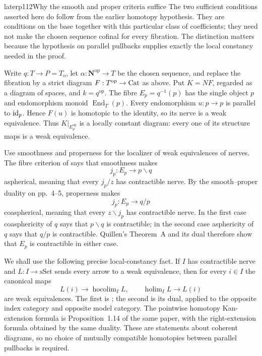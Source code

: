 \begin{dcomment}{later}{p112}{Why the smooth and proper criteria suffice}
The two sufficient conditions asserted here do follow from the earlier homotopy hypothesis. They are conditions on the base together with this particular class of coefficients; they need not make the chosen sequence cofinal for every fibration. The distinction matters because the hypothesis on parallel pullbacks supplies exactly the local constancy needed in the proof.

Write $q:T\to P=T_{\mathrm o}$, let $\alpha:\mathbf N^{\mathrm{op}}\to T$ be the chosen sequence, and replace the fibration by a strict diagram $F:T^{\mathrm{op}}\to\mathrm{Cat}$ as above. Put $K=NF$, regarded as a diagram of spaces, and $k=q^{\mathrm{op}}$. The fibre $E_p=q^{-1}(p)$ has the single object $p$ and endomorphism monoid $\operatorname{End}_T(p)$. Every endomorphism $u:p\to p$ is parallel to $\mathrm{id}_p$. Hence $F(u)$ is homotopic to the identity, so its nerve is a weak equivalence. Thus $K|_{E_p^{\mathrm{op}}}$ is a locally constant diagram: every one of its structure maps is a weak equivalence.

Use smoothness and properness for the localizer of weak equivalences of nerves. The fibre criterion of \citet[Theorem~1.2(b), printed p.~4]{Maltsiniotis2005Asphericite} says that smoothness makes
\[
 j_p:E_p\longrightarrow p\backslash q
\]
aspherical, meaning that every $j_p/z$ has contractible nerve. By the smooth--proper duality on pp.~4--5, properness makes
\[
 j_p:E_p\longrightarrow q/p
\]
coaspherical, meaning that every $z\backslash j_p$ has contractible nerve. In the first case coasphericity of $q$ says that $p\backslash q$ is contractible; in the second case asphericity of $q$ says that $q/p$ is contractible. Quillen's Theorem~A and its dual therefore show that $E_p$ is contractible in either case.

We shall use the following precise local-constancy fact. If $I$ has contractible nerve and $L:I\to\mathrm{sSet}$ sends every arrow to a weak equivalence, then for every $i\in I$ the canonical maps
\[
 L(i)\longrightarrow\operatorname{hocolim}_I L,
 \qquad
 \operatorname{holim}_I L\longrightarrow L(i)
\]
are weak equivalences. The first is \citet[Corollary~1.18, printed p.~599]{Cisinski2009LocallyConstant}; the second is its dual, applied to the opposite index category and opposite model category. The pointwise homotopy Kan-extension formula is Proposition~1.14 of the same paper, with the right-extension formula obtained by the same duality. These are statements about coherent diagrams, so no choice of mutually compatible homotopies between parallel pullbacks is required.


\end{dcomment}
